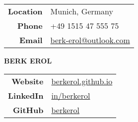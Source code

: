 \documentclass[a4paper, 10pt]{article}
\begin{document}
{\setlength{\tabcolsep}{0.1cm}
\begin{tabular}{r l}
    \textbf{Location} & Munich, Germany\\
    \textbf{Phone} & +49 1515 47 555 75\\
    \textbf{Email} & \href{mailto:berk-erol@outlook.com}{berk-erol@outlook.com}
\end{tabular}
\hspace{1.05cm} {\Huge \textbf{BERK EROL}} \hspace{1.95cm}
\begin{tabular}{r l}
    \textbf{Website} & \href{https://berkerol.github.io}{berkerol.github.io}\\
    \textbf{LinkedIn} & \href{https://www.linkedin.com/in/berkerol}{in/berkerol}\\
    \textbf{GitHub} & \href{https://github.com/berkerol}{berkerol}
\end{tabular}}
\end{document}
